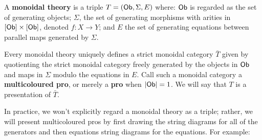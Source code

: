 \begin{definition}
\label{def:monoidaltheory}


A {\bf monoidal theory} is a triple $T=({\sf Ob},\Sigma ,E )$ where: ${\sf Ob}$ is regarded as the set of generating objects; $\Sigma$, the set of generating morphisms with arities in $[{\sf Ob}]\times [{\sf Ob}]$, denoted $f:X\to Y$;  and $E$ the set of generating equations between parallel maps generated by $\Sigma$.

Every monoidal theory uniquely defines a strict monoidal category $\bar T$ given by quotienting the strict monoidal category freely generated by the objects in $\sf Ob$ and maps in $\Sigma$ modulo the equations in $E$.  Call such a monoidal category a {\bf multicoloured pro}, or merely a {\bf pro} when $|{\sf Ob}|=1$.  We will say that $T$ is a presentation of $\bar T$.
\end{definition}



 In practice, we won't explicitly regard a  monoidal theory as a triple; rather, we will present multicoloured pros by first drawing the string diagrams for all of the generators and then equations string diagrams for the equations. For example:

